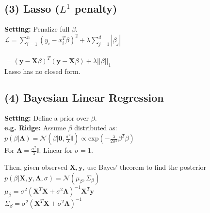 \subsection*{(3) Lasso ($L^1$ penalty)}
\textbf{Setting:} Penalize full $\beta$.\\
$\mathcal{L} = \sum_{i=1}^n(y_i-x_i^T\beta)^2+\lambda\sum_{j=1}^d|\beta_j| $\\\\
$=(\mathbf{y}-\mathbf{X}\beta)^T(\mathbf{y}-\mathbf{X}\beta)+\lambda||\beta||_1$\\
Lasso has no closed form.

\subsection*{(4) Bayesian Linear Regression}
\textbf{Setting:} Define a prior over $\beta$.\\
\textbf{e.g. Ridge:} Assume $\beta$ distributed as:\\
$p(\beta|\bm{\bm{\Lambda}}){=}\mathcal{N}(\beta|\mathbf{0},\frac{\sigma^2}{\lambda}\mathbb{I}) \propto \mathrm{exp}(-\frac{\lambda}{2\sigma^2}\beta^T\beta)$\\
For $\bm{\Lambda}=\frac{\sigma^2}{\lambda}\mathbb{I}$. Linear for $\sigma=1$.

Then, given observed $\mathbf{X},\mathbf{y}$, use Bayes' theorem to find the posterior\\
$p(\beta|\mathbf{X},\mathbf{y}, \bm{\Lambda}, \sigma) = \mathcal{N}(\mu_{\beta}, \Sigma_{\beta})$\\
$\mu_\beta = \sigma^2(\mathbf{X}^T\mathbf{X} +\sigma^2\bm{\Lambda})^{-1}\mathbf{X}^T\mathbf{y}$\\
$\Sigma_\beta = \sigma^2(\mathbf{X}^T\mathbf{X} +\sigma^2\bm{\Lambda})^{-1}$


